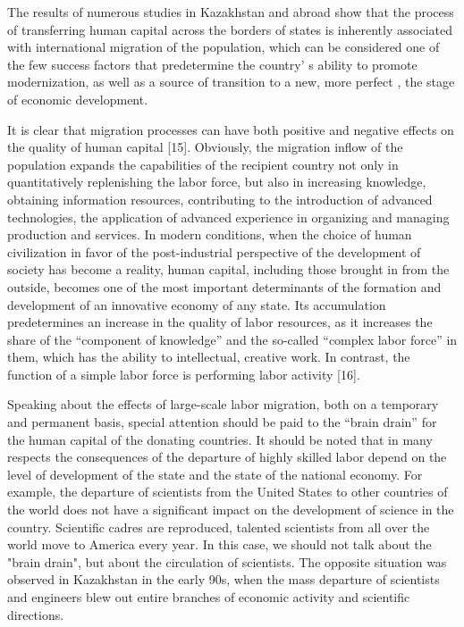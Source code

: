 \begin{multicols}{2}
The results of numerous studies in Kazakhstan and abroad show that the
process of transferring human capital across the borders of states is
inherently associated with international migration of the population,
which can be considered one of the few success factors that predetermine
the country' s ability to promote modernization, as well
as a source of transition to a new, more perfect , the stage of economic
development.

It is clear that migration processes can have both positive and negative
effects on the quality of human capital {[}15{]}. Obviously, the
migration inflow of the population expands the capabilities of the
recipient country not only in quantitatively replenishing the labor
force, but also in increasing knowledge, obtaining information
resources, contributing to the introduction of advanced technologies,
the application of advanced experience in organizing and managing
production and services. In modern conditions, when the choice of human
civilization in favor of the post-industrial perspective of the
development of society has become a reality, human capital, including
those brought in from the outside, becomes one of the most important
determinants of the formation and development of an innovative economy
of any state. Its accumulation predetermines an increase in the quality
of labor resources, as it increases the share of the ``component of
knowledge'' and the so-called ``complex labor force'' in them, which has
the ability to intellectual, creative work. In contrast, the function of
a simple labor force is performing labor activity {[}16{]}.

Speaking about the effects of large-scale labor migration, both on a
temporary and permanent basis, special attention should be paid to the
``brain drain'' for the human capital of the donating countries. It
should be noted that in many respects the consequences of the departure
of highly skilled labor depend on the level of development of the state
and the state of the national economy. For example, the departure of
scientists from the United States to other countries of the world does
not have a significant impact on the development of science in the
country. Scientific cadres are reproduced, talented scientists from all
over the world move to America every year. In this case, we should not
talk about the "brain drain", but about the circulation of scientists.
The opposite situation was observed in Kazakhstan in the early 90s, when
the mass departure of scientists and engineers blew out entire branches
of economic activity and scientific directions.


\end{multicols}
